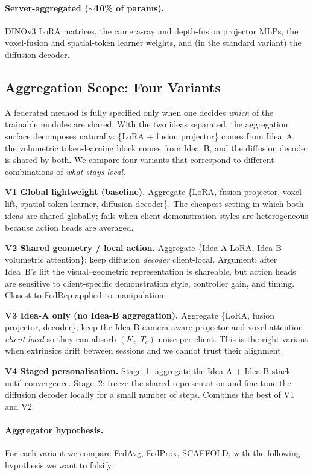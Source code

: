 \documentclass{article}
\begin{document}
\paragraph{Server-aggregated ($\sim$10\% of params).}
DINOv3 LoRA matrices, the camera-ray and depth-fusion projector
MLPs, the voxel-fusion and spatial-token learner weights, and (in
the standard variant) the diffusion decoder.

\subsection{Aggregation Scope: Four Variants}
\label{sec:agg}
A federated method is fully specified only when one decides
\emph{which} of the trainable modules are shared. With the two
ideas separated, the aggregation surface decomposes naturally:
\{LoRA + fusion projector\} comes from Idea~A, the volumetric
token-learning block comes from Idea~B, and the diffusion decoder
is shared by both. We compare four variants that
correspond to different combinations of \emph{what stays local}.

\noindent\textbf{V1 Global lightweight (baseline).} Aggregate
\{LoRA, fusion projector, voxel lift, spatial-token learner,
diffusion decoder\}. The cheapest setting in which both ideas are
shared globally; fails when client demonstration styles are
heterogeneous because action heads are averaged.

\noindent\textbf{V2 Shared geometry / local action.} Aggregate
\{Idea-A LoRA, Idea-B volumetric attention\}; keep diffusion
\emph{decoder} client-local. Argument: after Idea~B's lift the
visual--geometric representation is shareable, but action heads
are sensitive to client-specific demonstration style, controller
gain, and timing. Closest to FedRep \cite{fedrep} applied to
manipulation.

\noindent\textbf{V3 Idea-A only (no Idea-B aggregation).}
Aggregate \{LoRA, fusion projector, decoder\}; keep the Idea-B
camera-aware projector and voxel attention \emph{client-local} so
they can absorb $(K_c, T_c)$ noise per client. This is the
right variant when extrinsics drift between sessions and we
cannot trust their alignment.

\noindent\textbf{V4 Staged personalisation.} Stage~1: aggregate
the Idea-A + Idea-B stack until convergence. Stage~2: freeze the
shared representation and fine-tune the diffusion decoder locally
for a small number of steps. Combines the best of V1 and V2.

\paragraph{Aggregator hypothesis.}
For each variant we compare FedAvg, FedProx, SCAFFOLD, with the
following hypothesis we want to falsify:
\end{document}
